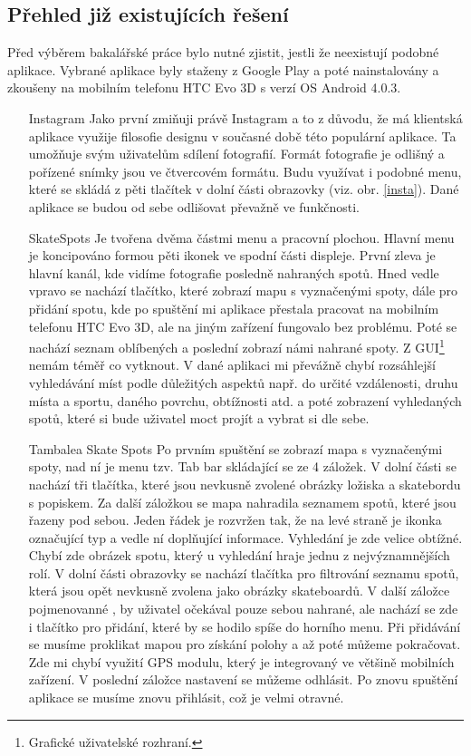 \documentclass[12pt]{article}
\begin{document}
\subsection{Přehled již existujících řešení}
Před výběrem bakalářské práce bylo nutné zjistit, jestli že
neexistují podobné aplikace. Vybrané aplikace byly staženy z Google Play a poté nainstalovány a zkoušeny na mobilním telefonu HTC Evo 3D s verzí OS Android 4.0.3.
\begin{itemize}
\item[Instagram] Jako první zmiňuji právě Instagram a to z důvodu, že má klientská aplikace využije filosofie designu v současné době této populární aplikace. Ta umožňuje svým uživatelům sdílení fotografií. Formát fotografie je odlišný a pořízené snímky jsou ve čtvercovém formátu. Budu využívat i podobné menu, které se  skládá z pěti tlačítek v dolní části obrazovky (viz. obr. \ref{insta}). Dané aplikace se budou od sebe odlišovat převažně ve funkčnosti.

\item[SkateSpots] Je tvořena dvěma částmi menu a pracovní plochou. Hlavní menu je koncipováno formou pěti ikonek ve spodní části displeje. První zleva je hlavní kanál, kde vidíme fotografie posledně nahraných spotů. Hned vedle vpravo se nachází tlačítko, které zobrazí mapu s vyznačenými spoty, dále pro přidání spotu, kde po spuštění mi aplikace přestala pracovat na mobilním telefonu HTC Evo 3D, ale na jiným zařízení fungovalo bez problému. Poté se nachází seznam oblíbených a poslední zobrazí námi nahrané spoty. Z GUI\footnote[4]{Grafické uživatelské rozhraní.} nemám téměř co vytknout. V dané aplikaci mi převážně chybí rozsáhlejší vyhledávání míst podle důležitých aspektů např. do určité vzdálenosti, druhu místa a sportu, daného povrchu, obtížnosti atd. a poté zobrazení vyhledaných spotů, které si bude uživatel moct projít a vybrat si dle sebe.

\item[Tambalea Skate Spots] Po prvním spuštění se zobrazí mapa s vyznačenými spoty, nad ní je menu tzv. Tab bar skládající se ze 4 záložek. V dolní části se nachází tři tlačítka, které jsou nevkusně zvolené obrázky ložiska a skatebordu s popiskem. Za další záložkou se mapa nahradila seznamem spotů, které jsou řazeny pod sebou. Jeden řádek je rozvržen tak, že na levé straně je ikonka označující typ a vedle ní doplňující informace. Vyhledání je zde velice obtížné. Chybí zde obrázek spotu, který u vyhledání hraje jednu z nejvýznamnějších rolí. V dolní části obrazovky se nachází tlačítka pro filtrování seznamu spotů, která jsou opět nevkusně zvolena jako obrázky skateboardů. V další záložce pojmenovanné , by uživatel očekával pouze sebou nahrané, ale nachází se zde i tlačítko pro přidání, které by se hodilo spíše do horního menu. Při přidávání se musíme proklikat mapou pro získání polohy a až poté můžeme pokračovat. Zde mi chybí využití GPS modulu, který je integrovaný ve většině mobilních zařízení. V poslední záložce nastavení se můžeme odhlásit. Po znovu spuštění aplikace se musíme znovu přihlásit, což je velmi otravné.
\end{itemize}
\end{document}
